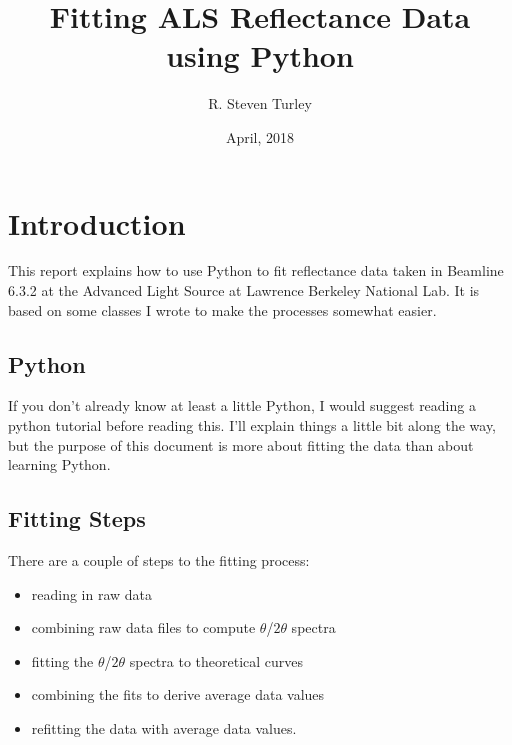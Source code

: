 \documentclass[english]{scrartcl}
\begin{document}
\title{Fitting ALS Reflectance Data using Python}
\author{R. Steven Turley}
\date{April, 2018}

\maketitle
\tableofcontents{}

\section{Introduction}

This report explains how to use Python to fit reflectance data
taken in Beamline 6.3.2 at the Advanced Light Source at Lawrence
Berkeley National Lab. It is based on some classes I wrote to
make the processes somewhat easier.

\subsection{Python}
If you don't already know at least a little Python, I would suggest
reading a python tutorial before reading this. I'll explain
things a little bit along the way, but the purpose of this document
is more about fitting the data than about learning Python.

\subsection{Fitting Steps}
There are a couple of steps to the fitting process:
\begin{itemize}
\item reading in raw data
\item combining raw data files to compute $\theta$/$2\theta$ spectra
\item fitting the $\theta$/$2\theta$ spectra to theoretical curves
\item combining the fits to derive average data values
\item refitting the data with average data values.
\end{itemize}
\end{document}
